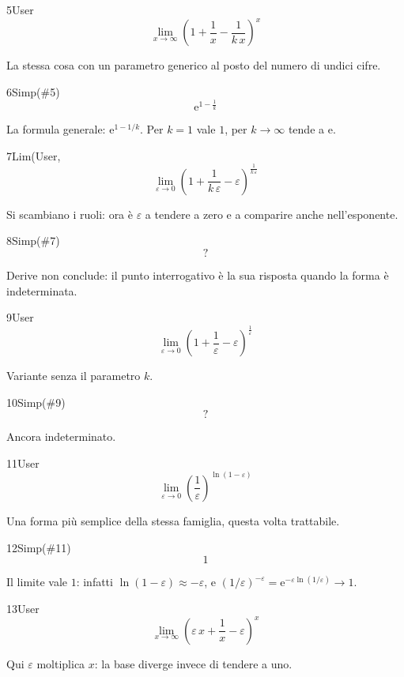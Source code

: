 \begin{espr}{5}{User}{}
\[
\lim_{x \to \infty} \left(1 + \frac{1}{x} - \frac{1}{k\, x}\right)^{x}
\]
\end{espr}
La stessa cosa con un parametro generico al posto del numero di undici cifre.

\begin{espr}{6}{Simp(\#5)}{}
\[
\mathrm{e}^{1 - \frac{1}{k}}
\]
\end{espr}
La formula generale: $\mathrm{e}^{1-1/k}$. Per $k=1$ vale $1$, per $k\to\infty$ tende a $\mathrm{e}$.

\begin{espr}{7}{Lim(User,}{}
\[
\lim_{\varepsilon \to 0} \left(1 + \frac{1}{k\, \varepsilon} - \varepsilon\right)^{\frac{1}{k\, \varepsilon}}
\]
\end{espr}
Si scambiano i ruoli: ora è $\varepsilon$ a tendere a zero e a comparire anche nell'esponente.

\begin{espr}{8}{Simp(\#7)}{}
\[
\mathrm{?}
\]
\end{espr}
Derive non conclude: il punto interrogativo è la sua risposta quando la forma è indeterminata.

\begin{espr}{9}{User}{}
\[
\lim_{\varepsilon \to 0} \left(1 + \frac{1}{\varepsilon} - \varepsilon\right)^{\frac{1}{\varepsilon}}
\]
\end{espr}
Variante senza il parametro $k$.

\begin{espr}{10}{Simp(\#9)}{}
\[
\mathrm{?}
\]
\end{espr}
Ancora indeterminato.

\begin{espr}{11}{User}{}
\[
\lim_{\varepsilon \to 0} \left(\frac{1}{\varepsilon}\right)^{\ln\!\left(1 - \varepsilon\right)}
\]
\end{espr}
Una forma più semplice della stessa famiglia, questa volta trattabile.

\begin{espr}{12}{Simp(\#11)}{}
\[
1
\]
\end{espr}
Il limite vale $1$: infatti $\ln(1-\varepsilon)\approx-\varepsilon$, e $(1/\varepsilon)^{-\varepsilon}=\mathrm{e}^{-\varepsilon\ln(1/\varepsilon)}\to1$.

\begin{espr}{13}{User}{}
\[
\lim_{x \to \infty} \left(\varepsilon\, x + \frac{1}{x} - \varepsilon\right)^{x}
\]
\end{espr}
Qui $\varepsilon$ moltiplica $x$: la base diverge invece di tendere a uno.

